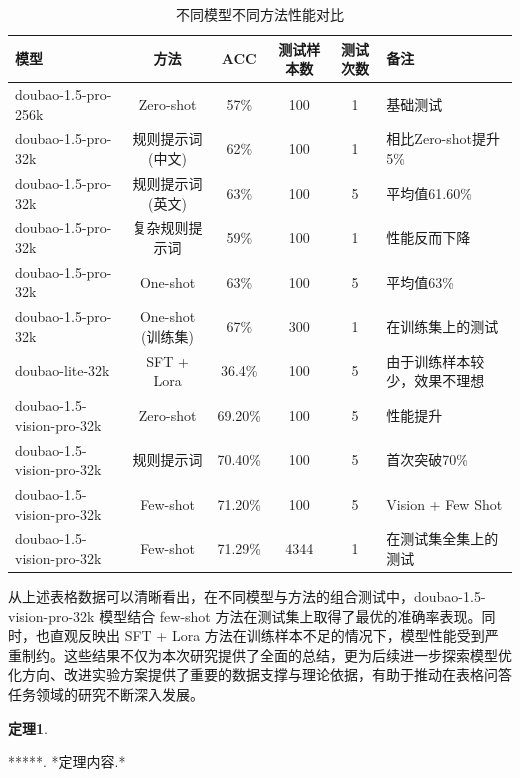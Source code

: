 \documentclass[10.5pt,compsoc]{CjC}
\theoremstyle{mystyle}
\begin{document}
\begin{CJK*}{UTF8}{zhhei}
\begin{table}[htbp]
\centering 
\caption{不同模型不同方法性能对比}
\label{tab:full_performance}
\vspace{-2.5mm}
\begin{center}
\begin{tabular}{lcccc}
\toprule
\textbf{模型} & \textbf{方法} & \textbf{ACC} & \textbf{测试样本数} & \textbf{测试次数} & \textbf{备注} \\
\midrule
doubao-1.5-pro-256k & Zero-shot & 57\% & 100 & 1 & 基础测试 \\
doubao-1.5-pro-32k & 规则提示词(中文) & 62\% & 100 & 1 & 相比Zero-shot提升5\% \\
doubao-1.5-pro-32k & 规则提示词(英文) & 63\% & 100 & 5 & 平均值61.60\% \\
doubao-1.5-pro-32k & 复杂规则提示词 & 59\% & 100 & 1 & 性能反而下降 \\
doubao-1.5-pro-32k & One-shot & 63\% & 100 & 5 & 平均值63\% \\
doubao-1.5-pro-32k & One-shot (训练集) & 67\% & 300 & 1 & 在训练集上的测试 \\
doubao-lite-32k & SFT + Lora & 36.4\% & 100 & 5 & 由于训练样本较少，效果不理想 \\
doubao-1.5-vision-pro-32k & Zero-shot & 69.20\% & 100 & 5 & 性能提升 \\
doubao-1.5-vision-pro-32k & 规则提示词 & 70.40\% & 100 & 5 & 首次突破70\% \\
doubao-1.5-vision-pro-32k & Few-shot & 71.20\% & 100 & 5 & Vision + Few Shot \\
doubao-1.5-vision-pro-32k & Few-shot & 71.29\% & 4344 & 1 & 在测试集全集上的测试 \\
\bottomrule
\end{tabular}
\end{center}
\end{table}


从上述表格数据可以清晰看出，在不同模型与方法的组合测试中，doubao-1.5-vision-pro-32k 模型结合 few-shot 方法在测试集上取得了最优的准确率表现。同时，也直观反映出 SFT + Lora 方法在训练样本不足的情况下，模型性能受到严重制约。这些结果不仅为本次研究提供了全面的总结，更为后续进一步探索模型优化方向、改进实验方案提供了重要的数据支撑与理论依据，有助于推动在表格问答任务领域的研究不断深入发展。



{\begin{CJK*}{UTF8}{zhhei}\textbf{定理1}.\end{CJK*}}\quad ******. *定理内容.*


\end{CJK*}
\end{document}
